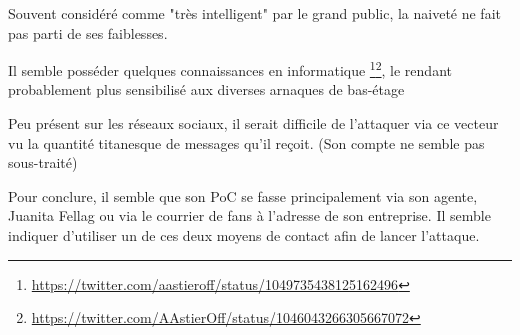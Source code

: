 Souvent considéré comme "très intelligent" par le grand public, la naiveté ne fait pas parti de ses faiblesses.

Il semble posséder quelques connaissances en informatique \footnote{\url{https://twitter.com/aastieroff/status/1049735438125162496}}\footnote{\url{https://twitter.com/AAstierOff/status/1046043266305667072}}, le rendant probablement plus sensibilisé aux diverses arnaques de bas-étage

Peu présent sur les réseaux sociaux, il serait difficile de l'attaquer via ce vecteur vu la quantité titanesque de messages qu'il reçoit. (Son compte ne semble pas sous-traité)

Pour conclure, il semble que son PoC se fasse principalement via son agente, Juanita Fellag ou via le courrier de fans à l'adresse de son entreprise. Il semble indiquer d'utiliser un de ces deux moyens de contact afin de lancer l'attaque.